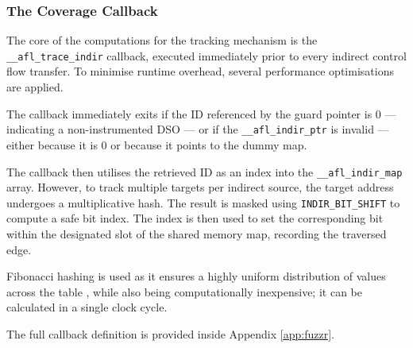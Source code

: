 \subsubsection{The Coverage Callback}

The core of the computations for the tracking mechanism is the \texttt{\_\_afl\_trace\_indir} callback, executed immediately prior to every indirect control flow transfer. To minimise runtime overhead, several performance optimisations are applied. 

The callback immediately exits if the ID referenced by the guard pointer is 0 --- indicating a non-instrumented DSO --- or if the \texttt{\_\_afl\_indir\_ptr} is invalid --- either because it is 0 or because it points to the dummy map.

The callback then utilises the retrieved ID as an index into the \texttt{\_\_afl\_indir\_map} array. However, to track multiple targets per indirect source, the target address undergoes a multiplicative hash. The result is masked using \texttt{INDIR\_BIT\_SHIFT} to compute a safe bit index. The index is then used to set the corresponding bit within the designated slot of the shared memory map, recording the traversed edge.

Fibonacci hashing is used as it ensures a highly uniform distribution of values across the table \cite{knuth1998art3}, while also being computationally inexpensive; it can be calculated in a single clock cycle.

The full callback definition is provided inside Appendix \ref{app:fuzzr}. 